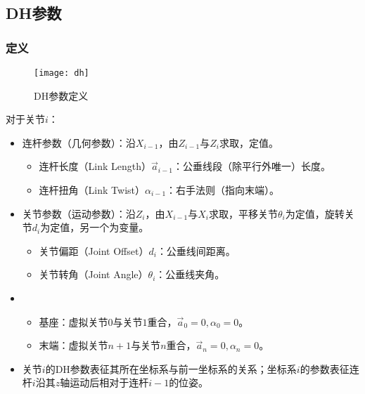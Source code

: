 \documentclass[
12pt, %
a4paper, 
oneside, %
headinclude,footinclude, %
]{scrartcl}
\begin{document}
\subsection[DH参数]{DH参数}
\subsubsection[定义]{定义}
\begin{figure}[H]
\centering 
\texttt{[image: dh]} 
\caption[DH参数]{DH参数定义}
\end{figure}

对于关节$ i $：
\begin{itemize}
\item 连杆参数（几何参数）：沿$ X_{i - 1} $，由$ Z_{i - 1} $与$ Z_i $求取，定值。
\begin{itemize}
\item 连杆长度（Link Length）$ \vec a_{i - 1}  $：公垂线段（除平行外唯一）长度。
\item 连杆扭角（Link Twist）$ \alpha_{i - 1} $：右手法则（指向末端）。
\end{itemize}
\item 关节参数（运动参数）：沿$ Z_i $，由$ X_{i - 1} $与$ X_i $求取，平移关节$ \theta_i $为定值，旋转关节$ d_i $为定值，另一个为变量。
\begin{itemize}
\item 关节偏距（Joint Offset）$ d_i $：公垂线间距离。
\item 关节转角（Joint Angle）$ \theta_i $：公垂线夹角。
\end{itemize}
\item 
\begin{itemize}
\item 基座：虚拟关节$ 0 $与关节$ 1 $重合，$ \vec a_0 = 0, \alpha_0 = 0 $。
\item 末端：虚拟关节$ n + 1 $与关节$ n $重合，$ \vec a_n = 0, \alpha_n = 0 $。
\end{itemize}
\item 关节$ i $的DH参数表征其所在坐标系与前一坐标系的关系；坐标系$ i $的参数表征连杆$ i $沿其$ z $轴运动后相对于连杆$ i - 1 $的位姿。
\end{itemize}
\end{document}
